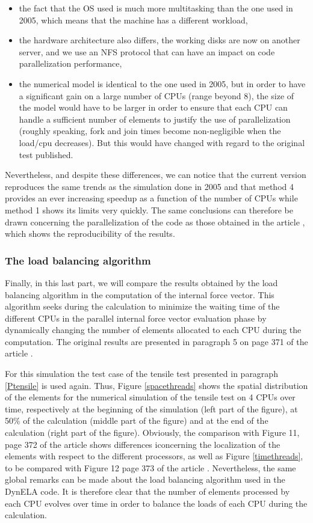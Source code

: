 \begin{itemize}
\item the fact that the OS used is much more multitasking than the one used in 2005, which means that the machine has a different workload,
\item the hardware architecture also differs, the working disks are now on another server, and we use an NFS protocol that can have an impact on code parallelization performance,
\item the numerical model is identical to the one used in 2005, but in order to have a significant gain on a large number of CPUs (range beyond 8), the size of the model would have to be larger in order to ensure that each CPU can handle a sufficient number of elements to justify the use of parallelization (roughly speaking, fork and join times become non-negligible when the load/cpu decreases). But this would have changed with regard to the original test published.
\end{itemize}
Nevertheless, and despite these differences, we can notice that the current version reproduces the same trends as the simulation done in 2005 and that method 4 provides an ever increasing speedup as a function of the number of CPUs while method 1 shows its limits very quickly. The same conclusions can therefore be drawn concerning the parallelization of the code as those obtained in the article \cite{Pantale:2005}, which shows the reproducibility of the results.

\subsubsection{The load balancing algorithm}

Finally, in this last part, we will compare the results obtained by the load balancing algorithm in the computation of the internal force vector. This algorithm seeks during the calculation to minimize the waiting time of the different CPUs in the parallel internal force vector evaluation phase by dynamically changing the number of elements allocated to each CPU during the computation. The original results are presented in paragraph 5 on page 371 of the article \cite{Pantale:2005}.

For this simulation the test case of the tensile test presented in paragraph \ref{Ptensile} is used again. Thus, Figure \ref{spacethreads} shows the spatial distribution of the elements for the numerical simulation of the tensile test on 4 CPUs over time, respectively at the beginning of the simulation (left part of the figure), at 50\% of the calculation (middle part of the figure) and at the end of the calculation (right part of the figure). Obviously, the comparison with Figure 11, page 372 of the article \cite{Pantale:2005} shows differences iconcerning the localization of the elements with respect to the different processors, as well as Figure \ref{timethreads}, to be compared with Figure 12 page 373 of the article \cite{Pantale:2005}. Nevertheless, the same global remarks can be made about the load balancing algorithm used in the DynELA code. It is therefore clear that the number of elements processed by each CPU evolves over time in order to balance the loads of each CPU during the calculation.


